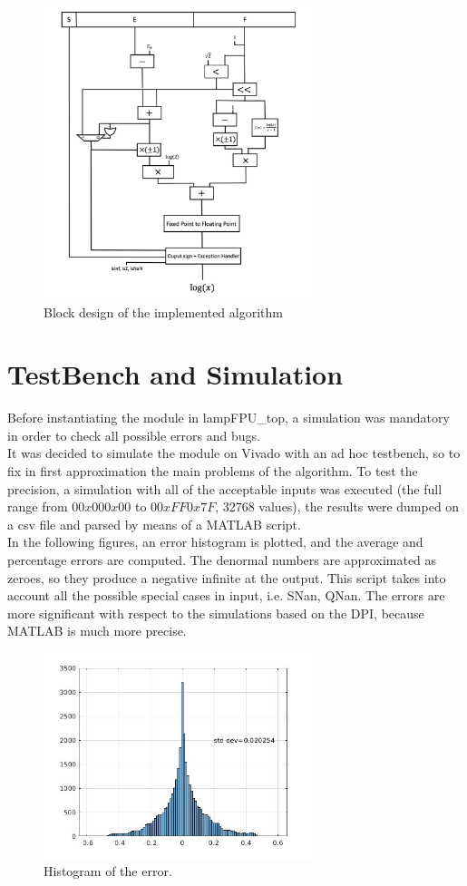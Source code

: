 \documentclass{report}
\begin{document}
\begin{figure}[ht]
  \centering
    \includegraphics[width=0.7\textwidth]{images/block_design.png}
    \caption{Block design of the implemented algorithm}
\end{figure}
    

\chapter{TestBench and Simulation}
Before instantiating the module in lampFPU\_top, a simulation was mandatory in order to check all possible errors and bugs.
\\It was decided to simulate the module on Vivado with an ad hoc testbench, so to fix in first approximation the main problems of the algorithm. To test the precision, a simulation with all of the acceptable inputs was executed (the full range from $0 0x00 0x00$ to $0 0xFF 0x7F$, 32768 values), the results were dumped on a csv file and parsed by means of a MATLAB script.
\\In the following figures, an error histogram is plotted, and the average and percentage errors are computed.
The denormal numbers are approximated as zeroes, so they produce a negative infinite at the output.
This script takes into account all the possible special cases in input, i.e. SNan, QNan.
The errors are more significant with respect to the simulations based on the DPI, because MATLAB is much more precise.
\begin{figure}[ht]
  \centering
    \includegraphics[width=0.7\textwidth]{images/hist.jpg}
    \caption{Histogram of the error.}
\end{figure}
    
\end{document}
